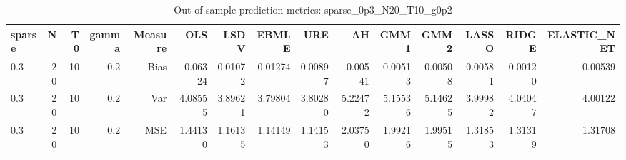 \begin{table}[!htbp]\centering
\caption{Out-of-sample prediction metrics: sparse_0p3_N20_T10_g0p2}
\label{tab:table3_sparse_0p3_N20_T10_g0p2}
\begin{tabular}{lrrrrrrrrrrrrrr}
\hline
sparse & N & T0 & gamma & Measure & OLS & LSDV & EBMLE & URE & AH & GMM1 & GMM2 & LASSO & RIDGE & ELASTIC_NET \\
\hline
0.3 & 20 & 10 & 0.2 & Bias & -0.06324 & 0.01072 & 0.01274 & 0.00897 & -0.00541 & -0.00513 & -0.00508 & -0.00581 & -0.00120 & -0.00539 \\
0.3 & 20 & 10 & 0.2 & Var & 4.08555 & 3.89621 & 3.79804 & 3.80280 & 5.22472 & 5.15536 & 5.14625 & 3.99982 & 4.04047 & 4.00122 \\
0.3 & 20 & 10 & 0.2 & MSE & 1.44130 & 1.16135 & 1.14149 & 1.14153 & 2.03750 & 1.99216 & 1.99515 & 1.31853 & 1.31319 & 1.31708 \\
\hline
\end{tabular}
\end{table}

